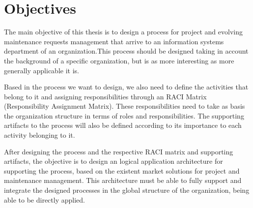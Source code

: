 
% 
% 

\section{Objectives}

The main objective of this thesis is to design a process for project and evolving maintenance requests management that arrive to an information systems department of an organization.This process should be designed taking in account the background of a specific organization, but is as more interesting as more generally applicable it is.\par
Based in the process we want to design, we also need to define the activities that belong to it and assigning responsibilities through an RACI Matrix (Responsibility Assignment Matrix). These responsibilities need to take as basis the organization structure in terms of roles and responsibilities. The supporting artifacts to the process will also be defined according to its importance to each activity belonging to it.\par
After designing the process and the respective RACI matrix and supporting artifacts, the objective is to design an logical application architecture for supporting the process, based on the existent market solutions for project and maintenance management. This architecture must be able to fully support and integrate the designed processes in the global structure of the organization,  being able to be directly applied.
